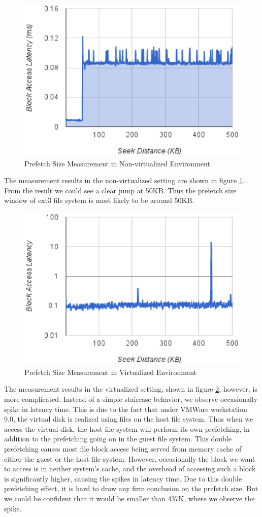 \begin{figure}
\centering
\includegraphics[width=.65\textwidth]{figures/prefetch_1.eps}
\caption{Prefetch Size Measurement in Non-virtualized Environment}
\label{fig:prefetch_1}
\end{figure}

The measurement results in the non-virtualized setting are shown in figure \ref{fig:prefetch_1}. From the result we could see a clear jump at 50KB. Thus the prefetch size window of ext3 file system is most likely to be around 50KB.

\begin{figure}
\centering
\includegraphics[width=.65\textwidth]{figures/prefetch_2.eps}
\caption{Prefetch Size Measurement in Virtualized Environment}
\label{fig:prefetch_2}
\end{figure}

The measurement results in the virtualized setting, shown in figure \ref{fig:prefetch_2}, however, is more complicated. Instead of a simple staircase behavior, we observe occasionally spike in latency time. This is due to the fact that under VMWare workstation 9.0, the virtual disk is realized using files on the host file system. Thus when we access the virtual disk, the host file system will perform its own prefetching, in addition to the prefetching going on in the guest file system. This double prefetching causes most file block access being served from memory cache of either the guest or the host file system. However, occasionally the block we want to access is in neither system's cache, and the overhead of accessing such a block is significantly higher, causing the spikes in latency time. Due to this double prefetching effect, it is hard to draw any firm conclusion on the prefetch size. But we could be confident that it would be smaller than 437K, where we observe the spike. 



